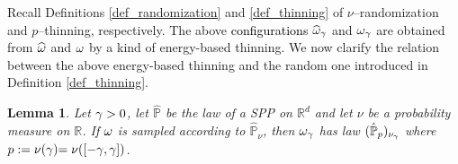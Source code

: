 \documentclass[12pt,a4paper,reqno]{amsart}
\newtheorem{Lemma}[Theorem]{Lemma}
\newcommand{\bbP}{{\ensuremath{\mathbb P}} }
\newcommand{\bbR}{{\ensuremath{\mathbb R}} }
\newcommand{\rosso}{\textcolor{black}} %
\begin{document}
Recall Definitions \ref{def_randomization}  and \ref{def_thinning} of $\nu$--randomization and $p$--thinning, respectively. The above  \rosso{configurations}   $\widehat{\omega}_\gamma$ and $\omega_\gamma$ are obtained from  $\widehat{\omega}$ and $\omega$ by a kind of energy-based thinning.  We now clarify the relation between the above energy-based thinning and the random one introduced in Definition  \ref{def_thinning}. 

\begin{Lemma}\label{lemma_2021} Let $\gamma>0$,  let $\hat\bbP$ be  the law of a SPP  on $\bbR^d$   and let $\nu$ be a probability measure on $\bbR$.
If $\omega$ is sampled according to $\hat \bbP_\nu$, then $\omega_\gamma $ has law $(\hat \bbP_p)_{\nu_\g}$ where $p:=\nu(\g)\rosso{=\nu([-\g,\g])}$.\end{Lemma}
\end{document}

